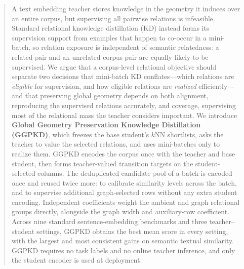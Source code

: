 \begin{abstract}
A text embedding teacher stores knowledge in the geometry it induces over an
entire corpus, but supervising all pairwise relations is infeasible. Standard
relational knowledge distillation (KD) instead forms its supervision support
from examples that happen to co-occur in a mini-batch, so relation exposure is
independent of semantic relatedness: a related pair and an unrelated corpus
pair are equally likely to be supervised. We argue that a
corpus-level relational objective should separate two decisions that mini-batch
KD conflates---which relations are \emph{eligible} for supervision, and how
eligible relations are \emph{realized} efficiently---and that preserving global
geometry depends on both alignment, reproducing the supervised relations
accurately, and coverage, supervising most of the relational mass the teacher
considers important. We introduce \textbf{Global Geometry Preservation
Knowledge Distillation (GGPKD)}, which freezes the base student's $k$NN
shortlists, asks the teacher to value the selected relations, and uses
mini-batches only to realize them. GGPKD encodes the corpus once with the
teacher and base student, then forms teacher-valued transition targets on the
student-selected columns. The deduplicated candidate pool of a batch is encoded
once and reused twice more: to calibrate similarity levels across the batch,
and to supervise additional graph-selected rows without any extra student
encoding. Independent coefficients weight the ambient and graph relational
groups directly, alongside the graph width and auxiliary-row coefficient.
Across nine standard sentence-embedding benchmarks and
three teacher--student settings, GGPKD obtains the best mean score in every
setting, with the largest and most consistent gains on semantic textual
similarity. GGPKD requires no task labels and no online teacher inference, and
only the student encoder is used at deployment.
\end{abstract}
